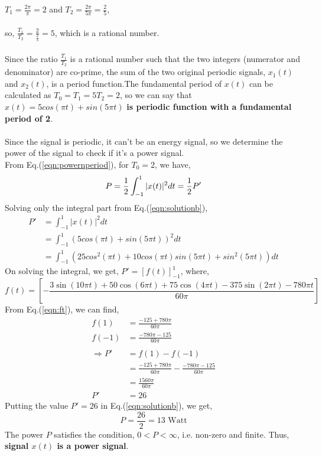 \documentclass{article}[12 pt]
\begin{document}
\begin{solution}
{\begin{enumerate}
$T_1=\frac{2\pi}{\pi}=2$ and $T_2=\frac{2\pi}{5 \pi}=\frac{2}{5}$,\\\\
    so, $\frac{T_1}{T_2}=\frac{2}{\frac{2}{5}}=5$, which is a rational number. \\\\Since the ratio $\frac{T_1}{T_2}$ is a rational number such that the two integers (numerator and denominator) are co-prime, the sum of the two original periodic signals, $x_1(t)$ and $x_2(t)$, is a period function.The fundamental period of $x(t)$ can be calculated as $T_0=T_1=5T_2=2$, so we can say that $x(t)=5cos(\pi t) + sin (5 \pi t)$ \textbf{is periodic function with a fundamental period of 2}.\\\\Since the signal is periodic, it can't be an energy signal, so we determine the power of the signal to check if it's a power signal.\\From Eq.(\ref{eqn:powernperiod}), for $T_0=2$, we have, 
    \begin{equation}
    \label{eqn:solutionb}
P=\frac{1}{2}\int_{-1}^{1}|x(t)|^2 dt=\frac{1}{2}P'\\
\end{equation}
Solving only the integral part from Eq.(\ref{eqn:solutionb}),
\begin{equation*}
\begin{aligned}
P'&=\int_{-1}^1 |x(t)|^2 dt\\
&=\int_{-1}^1 (5cos(\pi t) + sin (5 \pi t))^2dt\\
&=\int_{-1}^1 (25cos^2(\pi t) + 10cos(\pi t) sin (5 \pi t)+sin^2 (5 \pi t))dt
\end{aligned}
\end{equation*}
On solving the integral, we get, $P'=[f(t)]_{-1}^1$, where,
\begin{equation}
\label{eqn:ft}
f(t)=\left[-\frac{3\sin\left(10{\pi}t\right)+50\cos\left(6{\pi}t\right)+75\cos\left(4{\pi}t\right)-375\sin\left(2{\pi}t\right)-780{\pi}t}{60{\pi}}\right]
\end{equation}
From Eq.(\ref{eqn:ft}), we can find, 
\begin{equation*}
\begin{aligned}
f(1)&=\frac{-125+780 \pi }{60 \pi}\\
f(-1)&=\frac{-780 \pi-125}{60 \pi}\\\\
\Rightarrow P'&=f(1)-f(-1)\\
&=\frac{-125+780 \pi }{60 \pi}-\frac{-780 \pi-125}{60 \pi}\\
&=\frac{1560 \pi}{60 \pi}\\
P'&=26
\end{aligned}
\end{equation*}
Putting the value $P'=26$ in Eq.(\ref{eqn:solutionb}), we get, 
\begin{equation*}
P=\frac{26}{2}=13\text{ Watt}
\end{equation*}
The power $P$ satisfies the condition, $0<P<\infty$, i.e. non-zero and finite. Thus, \textbf{signal $x(t)$ is a power signal}.
\end{enumerate}
}
\end{solution}
\end{document}
